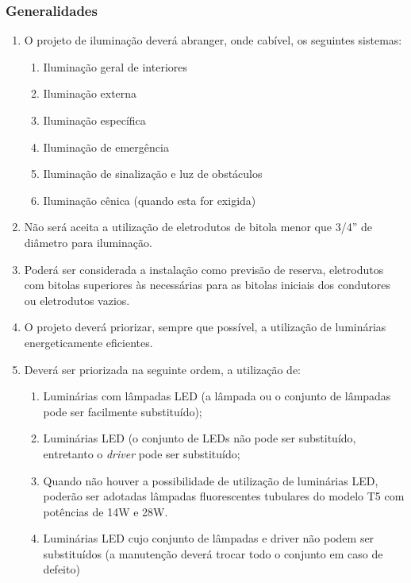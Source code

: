 \subsubsection{Generalidades} \label{lighting - generalidades}

\begin{enumerate}
	
	\item O projeto de iluminação deverá abranger, onde cabível, os seguintes sistemas:
	\begin{enumerate}
		\item Iluminação geral de interiores
		\item Iluminação externa
		\item Iluminação específica
		\item Iluminação de emergência
		\item Iluminação de sinalização e luz de obstáculos
		\item Iluminação cênica (quando esta for exigida)
	\end{enumerate}
	
	\item Não será aceita a utilização de eletrodutos de bitola menor que 3/4” de diâmetro para iluminação.
	
	\item Poderá ser considerada a instalação como previsão de reserva, eletrodutos com bitolas superiores às necessárias para as bitolas iniciais dos condutores ou eletrodutos vazios.
	
	\item O projeto deverá priorizar, sempre que possível, a utilização de luminárias energeticamente eficientes. 
	
	\item Deverá ser priorizada na seguinte ordem, a utilização de:
	\begin{enumerate}
		\item Luminárias com lâmpadas LED (a lâmpada ou o conjunto de lâmpadas pode ser facilmente substituído);
		
		\item Luminárias LED (o conjunto de LEDs não pode ser substituído, entretanto o \textit{driver} pode ser substituído;
		
		\item Quando não houver a possibilidade de utilização de luminárias LED, poderão ser adotadas lâmpadas fluorescentes tubulares do modelo T5 com potências de 14W e 28W.
		
		\item Luminárias LED cujo conjunto de lâmpadas e driver não podem ser substituídos (a manutenção deverá trocar todo o conjunto em caso de defeito)
		

\end{enumerate}
\end{enumerate}
